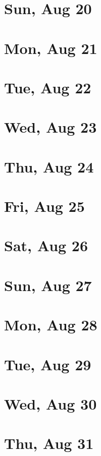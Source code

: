 	\section{Sun, Aug 20}
		
		
	\section{Mon, Aug 21}
		
		
	\section{Tue, Aug 22}
		
		
	\section{Wed, Aug 23}
		
		
	\section{Thu, Aug 24}
		
		
	\section{Fri, Aug 25}
		
		
	\section{Sat, Aug 26}
		
		
	\section{Sun, Aug 27}
		
		
	\section{Mon, Aug 28}
		
		
	\section{Tue, Aug 29}
		
		
	\section{Wed, Aug 30}
		
		
	\section{Thu, Aug 31}
		
		
